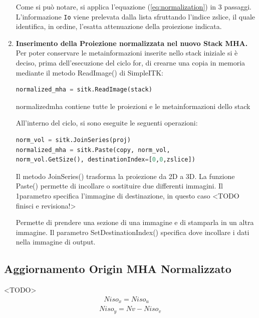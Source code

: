 \documentclass[a4paper,12pt, doubleside]{report}
\begin{document}
\begin{enumerate}
                    Come si può notare, si applica l'equazione (\ref{eq:normalization}) in 3 passaggi. L'informazione \texttt{Io} viene prelevata dalla lista sfruttando l'indice zslice, il quale identifica, in ordine, l'esatta attenuazione della proiezione indicata.
                    
                    \item \textbf{Inserimento della Proiezione normalizzata nel nuovo Stack MHA.}                    Per poter conservare le metainformazioni inserite nello stack iniziale si è deciso, prima dell'esecuzione del ciclo for, di crearne una copia in memoria mediante il metodo ReadImage() di SimpleITK:
                    
                    \begin{lstlisting}[language=python, frame=bt]
normalized_mha = sitk.ReadImage(stack)
                    \end{lstlisting} 
                    
                    normalized\textunderscore mha contiene tutte le proiezioni e le metainformazioni dello stack 
                     
                    All'interno del ciclo, si sono eseguite le seguenti operazioni:
                    \begin{lstlisting}[language=python, frame=bt]
norm_vol = sitk.JoinSeries(proj)
normalized_mha = sitk.Paste(copy, norm_vol, 
norm_vol.GetSize(), destinationIndex=[0,0,zslice])
                    \end{lstlisting}
                    
                    Il metodo JoinSeries() \cite{sitk-joinseries} trasforma la proiezione da 2D a 3D. La funzione Paste() \cite{sitk-paste} permette di incollare o sostituire due differenti immagini. Il 1\degree parametro specifica l'immagine di destinazione, in questo caso <TODO finisci e revisiona!>
                    
                    Permette di prendere una sezione di una immagine e di stamparla in un altra immagine. Il parametro SetDestinationIndex() specifica dove incollare i dati nella immagine di output.
                \end{enumerate}
                
        
            \subsection{Aggiornamento Origin MHA Normalizzato}
                <TODO>
                \begin{equation}
                    \begin{multlined}
                        \ \ \ Niso_x = Niso_u\\
                        Niso_y = Nv - Niso_v
                    \end{multlined}
                \end{equation}
        
\end{document}
